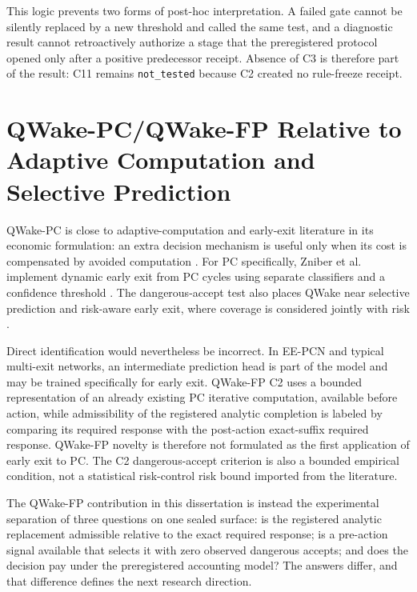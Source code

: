 This logic prevents two forms of post-hoc interpretation. A failed gate cannot be
silently replaced by a new threshold and called the same test, and a diagnostic result
cannot retroactively authorize a stage that the preregistered protocol opened only
after a positive predecessor receipt. Absence of C3 is therefore part of the result:
C11 remains \texttt{not\_tested} because C2 created no rule-freeze receipt.

\section{QWake-PC/QWake-FP Relative to Adaptive Computation and Selective Prediction}
\label{sec:discussion-related-qwake-en}

QWake-PC is close to adaptive-computation and early-exit literature in its economic
formulation: an extra decision mechanism is useful only when its cost is compensated by
avoided computation \cite{graves2016adaptive,bolukbasi2017adaptive}. For PC
specifically, Zniber et al. implement dynamic early exit from PC cycles using separate
classifiers and a confidence threshold \cite{zniber2025earlyexit}. The dangerous-accept
test also places QWake near selective prediction and risk-aware early exit, where
coverage is considered jointly with risk
\cite{geifman2019selectivenet,jazbec2024riskcontrol,valade2025eero}.

Direct identification would nevertheless be incorrect. In EE-PCN and typical
multi-exit networks, an intermediate prediction head is part of the model and may be
trained specifically for early exit. QWake-FP C2 uses a bounded representation of an
already existing PC iterative computation, available before action, while admissibility
of the registered analytic completion is labeled by comparing its required response
with the post-action exact-suffix required response. QWake-FP novelty is therefore not
formulated as the first application of early exit to PC. The C2 dangerous-accept
criterion is also a bounded empirical condition, not a statistical risk-control
risk bound imported from the literature.

The QWake-FP contribution in this dissertation is instead the experimental separation
of three questions on one sealed surface: is the registered analytic replacement
admissible relative to the exact required response; is a pre-action signal available
that selects it with zero observed dangerous accepts; and does the decision pay under
the preregistered accounting model? The answers differ, and that difference defines the
next research direction.

